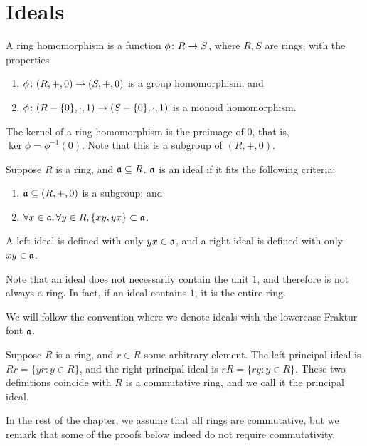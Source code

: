 \section{Ideals}

\begin{definition}
    A ring homomorphism is a function \(\phi\colon R\to S\),
    where \(R,S\) are rings,
    with the properties
    \begin{enumerate}[label={(\roman*)}, itemsep=0mm]
        \item \(\phi\colon(R,+,0)\to(S,+,0)\) is a group homomorphism; and
        \item \(\phi\colon(R - \{0\},\cdot,1)\to(S - \{0\},\cdot,1)\)
            is a monoid homomorphism.
    \end{enumerate}
\end{definition}
\begin{definition}
    The kernel of a ring homomorphism
    is the preimage of \(0\),
    that is, \(\ker\phi = \phi^{-1}(0)\).
    Note that this is a subgroup of \((R,+,0)\).
\end{definition}

\begin{definition}
    Suppose \(R\) is a ring, and \(\mathfrak{a} \subseteq R\).
    \(\mathfrak{a}\) is an ideal if it fits the following criteria:
    \begin{enumerate}[label={(\roman*)}, itemsep=0mm]
        \item \(\mathfrak{a} \subseteq (R,+,0)\) is a subgroup; and
        \item \(\forall x \in \mathfrak{a}, \forall y \in R, \{xy,yx\} \subset \mathfrak{a}\).
    \end{enumerate}
    A left ideal is defined with only \(yx \in \mathfrak{a}\),
    and a right ideal is defined with only \(xy \in \mathfrak{a}\).
\end{definition}
\begin{remark}
    Note that an ideal does not necessarily contain the unit \(1\),
    and therefore is not always a ring.
    In fact, if an ideal contains \(1\), it is the entire ring.
\end{remark}
\begin{remark}
    We will follow the convention where we denote ideals with the lowercase Fraktur font \(\mathfrak{a}\).
\end{remark}

\begin{definition}
    Suppose \(R\) is a ring, and \(r \in R\) some arbitrary element.
    The left principal ideal is \(Rr = \{yr : y \in R\}\),
    and the right principal ideal is \(rR = \{ry : y \in R\}\).
    These two definitions coincide with \(R\) is a commutative ring,
    and we call it the principal ideal.
\end{definition}
\begin{remark}
    In the rest of the chapter, we assume that all rings are commutative,
    but we remark that some of the proofs below indeed do not require commutativity.
\end{remark}

